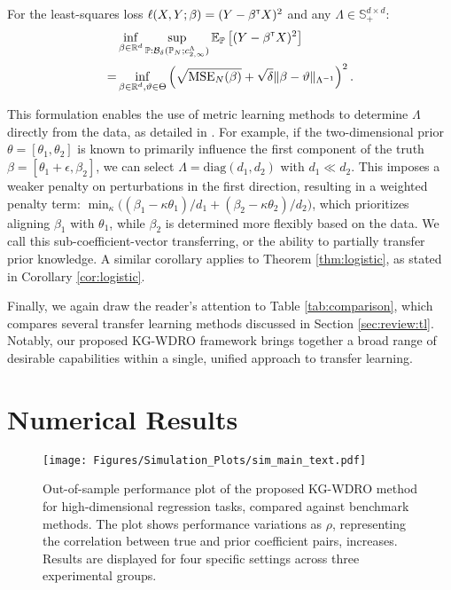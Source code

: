 \documentclass[12pt]{article}
\begin{document}
\begin{corollary}
\label{cor:linear_l2}
For the least-squares loss $\ell(X, Y; \beta) = (Y - \beta^{\scriptscriptstyle \sf T} X)^2$ and any $\Lambda \in \mathbb{S}_+^{d \times d}$:
\begin{align*}
    &\inf_{\beta \in \mathbb{R}^d} \sup_{\mathbb{P} : \mathcal{B}_\delta(\mathbb{P}_N; c_{2,\infty}^\Lambda)} \mathbb{E}_{\mathbb{P}}\left[(Y - \beta^{\scriptscriptstyle \sf T} X)^2\right] \\
=&\inf_{\beta \in \mathbb{R}^d, \vartheta \in \Theta} \left(\sqrt{{\rm MSE}_N(\beta)} + \sqrt{\delta} \Vert \beta - \vartheta \Vert_{\Lambda^{-1}}\right)^2.
\end{align*}
\end{corollary}

This formulation enables the use of metric learning methods to determine $\Lambda$ directly from the data, as detailed in \cite{blanchet2019data-drivencost}. For example, if the two-dimensional prior $\theta = [\theta_1, \theta_2]$ is known to primarily influence the first component of the truth $\beta = [\theta_1 + \epsilon, \beta_2]$, we can select $\Lambda = \mathrm{diag}(d_1, d_2)$ with $d_1 \ll d_2$. This imposes a weaker penalty on perturbations in the first direction, resulting in a weighted penalty term: $\min_{\kappa} \big({(\beta_1 - \kappa \theta_1)}/{d_1} + {(\beta_2 - \kappa \theta_2)}/{d_2}\big)$, which prioritizes aligning $\beta_1$ with $\theta_1$, while $\beta_2$ is determined more flexibly based on the data. We call this sub-coefficient-vector transferring, or the ability to partially transfer prior knowledge. A similar corollary applies to Theorem \ref{thm:logistic}, as stated in Corollary \ref{cor:logistic}. 

Finally, we again draw the reader's attention to Table \ref{tab:comparison}, which compares several transfer learning methods discussed in Section \ref{sec:review:tl}. Notably, our proposed KG-WDRO framework brings together a broad range of desirable capabilities within a single, unified approach to transfer learning.

\section{Numerical Results}
\label{sec:numerical}
\begin{figure*}[ht]
    \centering
    \texttt{[image: Figures/Simulation\_Plots/sim\_main\_text.pdf]}
    \caption{Out-of-sample performance plot of the proposed KG-WDRO method for high-dimensional regression tasks, compared against benchmark methods. The plot shows performance variations as $\rho$, representing the correlation between true and prior coefficient pairs, increases. Results are displayed for four specific settings across three experimental groups.}
    \label{fig:sim_main_text}
\end{figure*}
\end{document}
